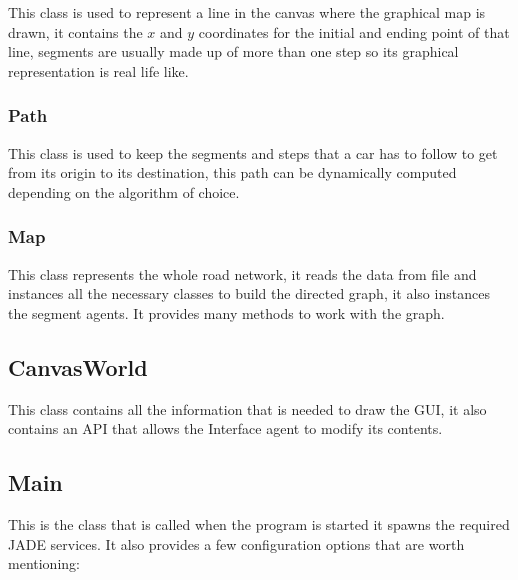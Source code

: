 This class is used to represent a line in the canvas where the graphical map is drawn, it contains the $x$ and $y$ coordinates for the initial and ending point of that line, segments are usually made up of more than one step so its graphical representation is real life like.

\subsubsection{Path}

This class is used to keep the segments and steps that a car has to follow to get from its origin to its destination, this path can be dynamically computed depending on the algorithm of choice.

\subsubsection{Map}

This class represents the whole road network, it reads the data from file and instances all the necessary classes to build the directed graph, it also instances the segment agents. It provides many methods to work with the graph.

\subsection{CanvasWorld}

This class contains all the information that is needed to draw the GUI, it also contains an API that allows the Interface agent to modify its contents.

\subsection{Main}

This is the class that is called when the program is started it spawns the required JADE services. It also provides a few configuration options that are worth mentioning:

